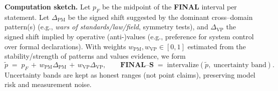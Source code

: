 \documentclass[11pt,a4paper]{article}
\begin{document}
\vspace{0.5em}
\noindent\textbf{Computation sketch.} Let $p_F$ be the midpoint of the \textbf{FINAL} interval per statement. Let $\Delta_{\text{PM}}$ be the signed shift suggested by the dominant cross–domain pattern(s) (e.g., \emph{wars of standards/law/field}, symmetry tests), and $\Delta_{\text{VP}}$ the signed shift implied by operative (anti-)values (e.g., preference for system control over formal declarations). With weights $w_{\text{PM}},w_{\text{VP}}\in[0,1]$ estimated from the stability/strength of patterns and values evidence, we form
\[
\tilde p \;=\; p_F \,+\, w_{\text{PM}}\Delta_{\text{PM}} \,+\, w_{\text{VP}}\Delta_{\text{VP}}, 
\qquad
\textbf{FINAL--S} \;=\; \text{intervalize}(\tilde p,\;\text{uncertainty band}).
\]
Uncertainty bands are kept as honest ranges (not point claims), preserving model risk and measurement noise.
\end{document}
